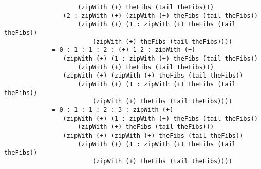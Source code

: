 \begin{verbatim}
                    (zipWith (+) theFibs (tail theFibs)))
                (2 : zipWith (+) (zipWith (+) theFibs (tail theFibs)) 
                    (zipWith (+) (1 : zipWith (+) theFibs (tail theFibs)) 
                        (zipWith (+) theFibs (tail theFibs))))
             = 0 : 1 : 1 : 2 : (+) 1 2 : zipWith (+) 
                (zipWith (+) (1 : zipWith (+) theFibs (tail theFibs)) 
                    (zipWith (+) theFibs (tail theFibs)))
                (zipWith (+) (zipWith (+) theFibs (tail theFibs)) 
                    (zipWith (+) (1 : zipWith (+) theFibs (tail theFibs)) 
                        (zipWith (+) theFibs (tail theFibs))))
             = 0 : 1 : 1 : 2 : 3 : zipWith (+) 
                (zipWith (+) (1 : zipWith (+) theFibs (tail theFibs)) 
                    (zipWith (+) theFibs (tail theFibs)))
                (zipWith (+) (zipWith (+) theFibs (tail theFibs)) 
                    (zipWith (+) (1 : zipWith (+) theFibs (tail theFibs)) 
                        (zipWith (+) theFibs (tail theFibs))))
\end{verbatim}
